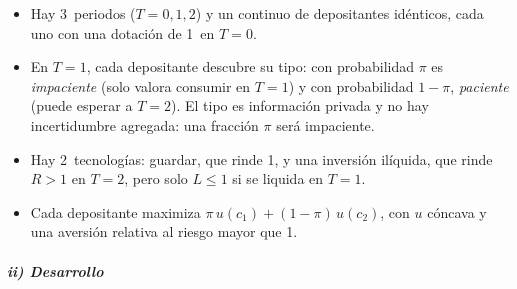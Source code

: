 \documentclass[11pt]{article}
\begin{document}
\begin{itemize}
\item Hay 3~periodos ($T=0,1,2$) y un continuo de depositantes idénticos, cada uno con una dotación de 1~en $T=0$\nocite{FreixasRochet2008Microeconomics}.
\item En $T=1$, cada depositante descubre su tipo: con probabilidad $\pi$ es \emph{impaciente} (solo valora consumir en $T=1$) y con probabilidad $1-\pi$, \emph{paciente} (puede esperar a $T=2$). El tipo es información privada y no hay incertidumbre agregada: una fracción $\pi$ será impaciente.
\item Hay 2~tecnologías: guardar, que rinde 1, y una inversión ilíquida, que rinde $R>1$ en $T=2$, pero solo $L\leq1$ si se liquida en $T=1$.
\item Cada depositante maximiza $\pi\,u(c_1)+(1-\pi)\,u(c_2)$, con $u$ cóncava y una aversión relativa al riesgo mayor que 1.
\end{itemize}

\subparagraph{ii) Desarrollo}
\end{document}
